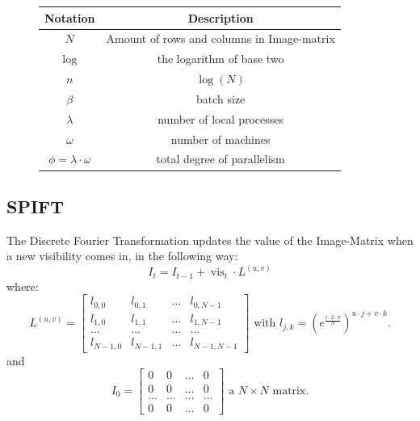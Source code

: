 \documentclass[12pt]{article}
\DeclareMathOperator{\vis}{vis}
\begin{document}
\begin{figure} [H]
	\begin{center}
		\begin{tabular}{||c c ||} 
			\hline
			Notation & Description \\ [0.5ex] 
			\hline\hline
			$N$ & Amount of rows and columns in Image-matrix\\
			\hline
			$\log$ & the logarithm of base two\\
			\hline
			$n$ & $\log(N)$\\
			\hline
			$\beta$ & batch size\\
			\hline
			$\lambda$ & number of local processes\\
			\hline
			$\omega$ & number of machines\\
			\hline
			$\phi=\lambda \cdot  \omega$ & total degree of parallelism \\
			\hline\hline
		\end{tabular}
	\label{fig::notation}
	\end{center}
\end{figure}

\subsection{SPIFT}
\label{sec::Spift}

The Discrete Fourier Transformation updates the value of the Image-Matrix when a new visibility comes in, in the following way: 
\[
{I_t}={I_{t-1}} + \vis_t\cdot {L^{(u,v)}}
\]
where:
\[
L^{(u,v)} =
\begin{bmatrix}
	l_{0,0} & l_{0,1} & ... & l_{0,N-1}\\
	l_{1,0} & l_{1,1} & ... & l_{1,N-1}\\
	... & ... & ... & ...\\
	l_{N-1,0} & l_{N-1,1} & ... & l_{N-1,N-1}
\end{bmatrix}
\textrm{ with }l_{j,k} = (e^{\frac{i\cdot 2\cdot \pi}{N}})^{u\cdot j+v\cdot k}.
\] and
\[
I_0 =
\begin{bmatrix}
0 & 0 & ... & 0\\
0 & 0 & ... & 0\\
... & ... & ... & ...\\
0 & 0 & ... & 0
\end{bmatrix}
\textrm{ a } N\times N \textrm{ matrix}.
\]\\
\end{document}
